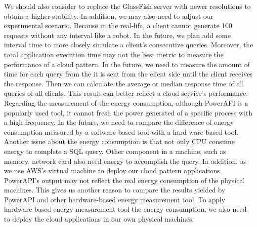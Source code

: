 \documentclass{article}
\begin{document}
We should also consider to replace the GlassFish server with newer resolutions to obtain a higher stability. In addition, we may also need to adjust our experimental scenario. Because in the real-life, a client cannot generate 100 requests without any interval like a robot. In the future, we plan add some interval time to more closely simulate a client's consecutive queries. Moreover, the total application execution time may not the best metric to measure the performance of a cloud pattern. In the future, we need to measure the amount of time for each query from the it is sent from the client side until the client receives the response. Then we can calculate the average or median response time of all queries of all clients. This result can better reflect a cloud service's performance. \\

Regarding the measurement of the energy consumption, although PowerAPI is a popularly used tool, it cannot fresh the power generated of a specific process with a high frequency. In the future, we need to compare the difference of energy consumption measured by a software-based tool with a hard-ware based tool. Another issue about the energy consumption is that not only CPU consume energy to complete a SQL query. Other component in a machine, such as memory, network card also need energy to accomplish the query. In addition, as we use AWS's virtual machine to deploy our cloud pattern applications, PowerAPI's output may not reflect the real energy consumption of the physical machines. This gives us another reason to compare the results yielded by PowerAPI and other hardware-based energy measurement tool. To apply hardware-based energy measurement tool the energy consumption, we also need to deploy the cloud applications in our own physical machines. 



\end{document}
